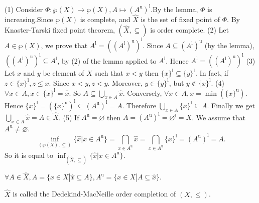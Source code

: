 \documentclass{book}
\numberwithin{equation}{section}
\begin{document}
\begin{proofenv}
    \quad
    \newline
    (1) Consider $\Phi :\wp(X)\rightarrow\wp(X), A\mapsto(A^\mathrm{u})^\mathrm{l}$.By the lemma,  $\Phi $  is increasing.Since $\wp(X)$ is complete, and $\hat{X}$ is the set of fixed point of $\Phi$. By Knaster-Tarski fixed point theorem, $(\hat{X}, \subseteq)$ is order complete.
    \newline
    (2) Let $A\in \wp(X)$,  we prove that $A^\mathrm{l}=((A^\mathrm{l})^\mathrm{u})^\mathrm{l}$. Since $A\subseteq (A^\mathrm{l})^\mathrm{u}$ (by the lemma),  $((A^\mathrm{l})^\mathrm{u})^\mathrm{l}\subseteq A^\mathrm{l}$,  by (2) of the lemma applied to $A^\mathrm{l}$. Hence $A^\mathrm{l}=((A^\mathrm{l})^\mathrm{u})^\mathrm{l}$
    \newline
    (3) Let $x$ and $y$ be element of $X$ such that $x< y$ then $\{x\}^\mathrm{l}\subseteq\{y\}^\mathrm{l}$. In fact,  if $z\in \{x\}^\mathrm{l}, z\le x$. Since $x<y, z<y$. Moreover,  $y\in \{y\}^\mathrm{l}$,  but $y\notin \{x\}^\mathrm{l}$.
    \newline
    (4) $\forall x \in A, x\in \{x\}^\mathrm{l}=\hat{x}$. So $A\subseteq\bigcup_{x\in A}\hat{x}$.
    Conversely,  $\forall x\in A,  x=\min (\{x\}^\mathrm{u})$. Hence $\{x\}^\mathrm{l}=(\{x\}^\mathrm{u})^\mathrm{l}\subseteq (A^\mathrm{u})^\mathrm{l}=A$. Therefore $\bigcup_{x\in A}\{x\}^\mathrm{l}\subseteq A$. Finally we get $\bigcup_{x\in A}\hat{x}=A\in \hat{X}$.
    \newline
    (5) If $A^\mathrm{u}=\varnothing$ then $A=(A^\mathrm{u})^\mathrm{l}=\varnothing^\mathrm{l}=X$. We assume that $A^\mathrm{u}\not=\varnothing$.
    $$\inf _{(\wp(X), \subseteq)}\{\hat{x}|x\in A^\mathrm{u}\}=\bigcap_{x\in A^\mathrm{u}}\hat{x}=\bigcap_{x\in A^\mathrm{u}}\{x\}^\mathrm{l}=(A^\mathrm{u})^\mathrm{l}=A.$$
    So it is equal to $\inf_{(\hat{X}, \subseteq)}\{\hat{x}|x\in A ^\mathrm{u}\}$.
\end{proofenv}
\begin{remark}
    $\forall A\in \hat{X}, A=\{x\in X|\hat{x}\subseteq A\}, A^\mathrm{u}=\{x\in X|A\subseteq \hat{x}\}$.
\end{remark}
\begin{definitionenv}
    $\hat{X}$ is called the Dedekind-MacNeille order completion of $(X, \le)$.
\end{definitionenv}
\end{document}
